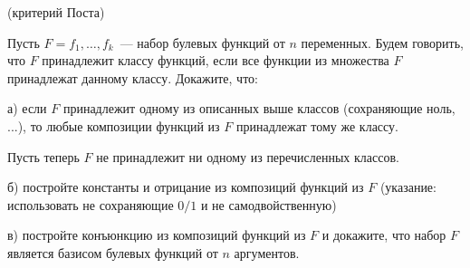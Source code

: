 
(критерий Поста)

Пусть $F = {f_1, \dots, f_k}$~--- набор булевых функций от $n$ переменных. Будем
говорить, что $F$ принадлежит классу функций, если все функции из множества $F$
принадлежат данному классу.  Докажите, что:

а) если $F$ принадлежит одному из описанных выше классов (сохраняющие ноль, ...), то
любые композиции функций из $F$ принадлежат тому же классу.
    
Пусть теперь $F$ не принадлежит ни одному из перечисленных классов.
    
б) постройте константы и отрицание из композиций функций из $F$ (указание:
использовать не сохраняющие $0/1$ и не самодвойственную) 

в) постройте конъюнкцию из композиций функций из $F$ и докажите, что набор $F$
является базисом булевых функций от $n$ аргументов.
